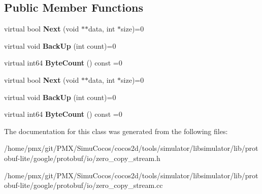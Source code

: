 \subsection*{Public Member Functions}
\begin{DoxyCompactItemize}
\item 
\mbox{\label{classgoogle_1_1protobuf_1_1io_1_1ZeroCopyOutputStream_abd2f16d834020f8ee2f97813bdc95bfa}} 
virtual bool {\bfseries Next} (void $\ast$$\ast$data, int $\ast$size)=0
\item 
\mbox{\label{classgoogle_1_1protobuf_1_1io_1_1ZeroCopyOutputStream_a47e79f4847dde175dff30f9b29c169c4}} 
virtual void {\bfseries Back\+Up} (int count)=0
\item 
\mbox{\label{classgoogle_1_1protobuf_1_1io_1_1ZeroCopyOutputStream_a1a75ad8fb798d2a0fb9a84a41e8cc1ea}} 
virtual int64 {\bfseries Byte\+Count} () const =0
\item 
\mbox{\label{classgoogle_1_1protobuf_1_1io_1_1ZeroCopyOutputStream_abd2f16d834020f8ee2f97813bdc95bfa}} 
virtual bool {\bfseries Next} (void $\ast$$\ast$data, int $\ast$size)=0
\item 
\mbox{\label{classgoogle_1_1protobuf_1_1io_1_1ZeroCopyOutputStream_a47e79f4847dde175dff30f9b29c169c4}} 
virtual void {\bfseries Back\+Up} (int count)=0
\item 
\mbox{\label{classgoogle_1_1protobuf_1_1io_1_1ZeroCopyOutputStream_a1a75ad8fb798d2a0fb9a84a41e8cc1ea}} 
virtual int64 {\bfseries Byte\+Count} () const =0
\end{DoxyCompactItemize}


The documentation for this class was generated from the following files\+:\begin{DoxyCompactItemize}
\item 
/home/pmx/git/\+P\+M\+X/\+Simu\+Cocos/cocos2d/tools/simulator/libsimulator/lib/protobuf-\/lite/google/protobuf/io/zero\+\_\+copy\+\_\+stream.\+h\item 
/home/pmx/git/\+P\+M\+X/\+Simu\+Cocos/cocos2d/tools/simulator/libsimulator/lib/protobuf-\/lite/google/protobuf/io/zero\+\_\+copy\+\_\+stream.\+cc\end{DoxyCompactItemize}
